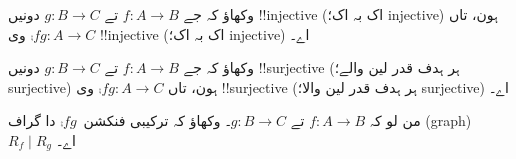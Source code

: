 \documentclass[../../../include/open-logic-section]{subfiles}
\begin{document}
\begin{prob}
وکھاؤ کہ جے $f \colon A \to B$ تے $g \colon B \to C$ دونیں
!!{injective} (اک بہ اک؛ injective) ہون، تاں
$\comp{f}{g}\colon A \to C$ وی !!{injective} (اک بہ اک؛ injective)
اے۔
\end{prob}

\begin{prob}
وکھاؤ کہ جے $f \colon A \to B$ تے $g \colon B \to C$ دونیں
!!{surjective} (ہر ہدف قدر لین والے؛ surjective) ہون، تاں
$\comp{f}{g}\colon A \to C$ وی !!{surjective} (ہر ہدف قدر لین والا؛
surjective) اے۔
\end{prob}

\begin{prob}
من لو کہ $f \colon A \to B$ تے $g \colon B \to C$۔ وکھاؤ کہ
ترکیبی فنکشن~$\comp{f}{g}$ دا گراف (graph) $R_f \mid R_g$ اے۔
\end{prob}
\end{document}
